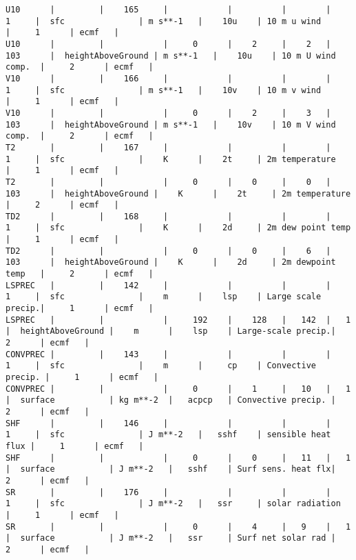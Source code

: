 \documentclass{egu}                  %
\begin{document}
\begin{landscape}
\begin{scriptsize}
\begin{verbatim}
U10      |         |    165     |            |          |        |     1     |  sfc               | m s**-1   |    10u    | 10 m u wind        |     1      | ecmf   |
U10      |         |            |     0      |    2     |    2   |  103      |  heightAboveGround | m s**-1   |    10u    | 10 m U wind comp.  |     2      | ecmf   |
V10      |         |    166     |            |          |        |     1     |  sfc               | m s**-1   |    10v    | 10 m v wind        |     1      | ecmf   |
V10      |         |            |     0      |    2     |    3   |  103      |  heightAboveGround | m s**-1   |    10v    | 10 m V wind comp.  |     2      | ecmf   |
T2       |         |    167     |            |          |        |     1     |  sfc               |    K      |    2t     | 2m temperature     |     1      | ecmf   |
T2       |         |            |     0      |    0     |    0   |  103      |  heightAboveGround |    K      |    2t     | 2m temperature     |     2      | ecmf   |
TD2      |         |    168     |            |          |        |     1     |  sfc               |    K      |    2d     | 2m dew point temp  |     1      | ecmf   |
TD2      |         |            |     0      |    0     |    6   |  103      |  heightAboveGround |    K      |    2d     | 2m dewpoint temp   |     2      | ecmf   |
LSPREC   |         |    142     |            |          |        |     1     |  sfc               |    m      |    lsp    | Large scale precip.|     1      | ecmf   |
LSPREC   |         |            |     192    |    128   |   142  |   1       |  heightAboveGround |    m      |    lsp    | Large-scale precip.|     2      | ecmf   |
CONVPREC |         |    143     |            |          |        |     1     |  sfc               |    m      |     cp    | Convective precip. |     1      | ecmf   |
CONVPREC |         |            |     0      |    1     |   10   |   1       |  surface           | kg m**-2  |   acpcp   | Convective precip. |     2      | ecmf   |
SHF      |         |    146     |            |          |        |     1     |  sfc               | J m**-2   |   sshf    | sensible heat flux |     1      | ecmf   |
SHF      |         |            |     0      |    0     |   11   |   1       |  surface           | J m**-2   |   sshf    | Surf sens. heat flx|     2      | ecmf   |
SR       |         |    176     |            |          |        |     1     |  sfc               | J m**-2   |   ssr     | solar radiation    |     1      | ecmf   |
SR       |         |            |     0      |    4     |   9    |   1       |  surface           | J m**-2   |   ssr     | Surf net solar rad |     2      | ecmf   |

\end{verbatim}
\end{scriptsize}
\end{landscape}
\end{document}
